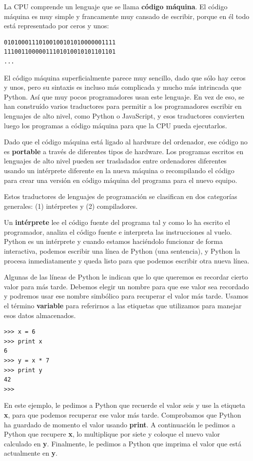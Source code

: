 La CPU comprende un lenguaje que se llama {\bf código máquina}. El código
máquina es muy simple y francamente muy cansado de escribir, porque
en él todo está representado por ceros y unos:

\beforeverb
\begin{verbatim}
01010001110100100101010000001111
11100110000011101010010101101101
...
\end{verbatim}
\afterverb
%
El código máquina superficialmente parece muy sencillo, dado que sólo hay
ceros y unos, pero su sintaxis es incluso más complicada
y mucho más intrincada que Python. Así que muy pocos programadores
usan este lenguaje. En vez de eso, se han construído varios traductores para
permitir a los programadores escribir en lenguajes de alto nivel, como Python
o JavaScript, y esos traductores convierten luego los programas a código máquina
para que la CPU pueda ejecutarlos.

Dado que el código máquina está ligado al hardware del ordenador, ese código
no es {\bf portable} a través de diferentes tipos de hardware. Los programas escritos
en lenguajes de alto nivel pueden ser trasladados entre ordenadores diferentes usando
un intérprete diferente en la nueva máquina o recompilando el código para crear
una versión en código máquina del programa para el nuevo equipo.

Estos traductores de lenguajes de programación se clasifican en dos categorías generales:
(1) intérpretes y (2) compiladores.

Un {\bf intérprete} lee el código fuente del programa tal y como lo ha escrito
el programador, analiza el código fuente e interpreta las instrucciones al vuelo.
Python es un intérprete y cuando estamos haciéndolo funcionar de forma interactiva,
podemos escribir una línea de Python (una sentencia), y Python la procesa inmediatamente
y queda listo para que podemos escribir otra nueva línea.

Algunas de las líneas de Python le indican que lo que queremos es recordar cierto
valor para más tarde. Debemos elegir un nombre para que ese valor sea recordado y
podremos usar ese nombre simbólico para recuperar el valor más tarde. Usamos el
término {\bf variable} para referirnos a las etiquetas que utilizamos para manejar esos
datos almacenados.

\beforeverb
\begin{verbatim}
>>> x = 6
>>> print x
6
>>> y = x * 7
>>> print y
42
>>> 
\end{verbatim}
\afterverb
%
En este ejemplo, le pedimos a Python que recuerde el valor seis y use la etiqueta {\bf x},
para que podemos recuperar ese valor más tarde. Comprobamos que Python ha guardado de
momento el valor usando {\bf print}. A continuación le pedimos a Python que recupere {\bf x}, lo multiplique por siete y coloque el nuevo valor calculado en {\bf y}. Finalmente, le pedimos a Python que imprima el valor que está actualmente en {\bf y}.

